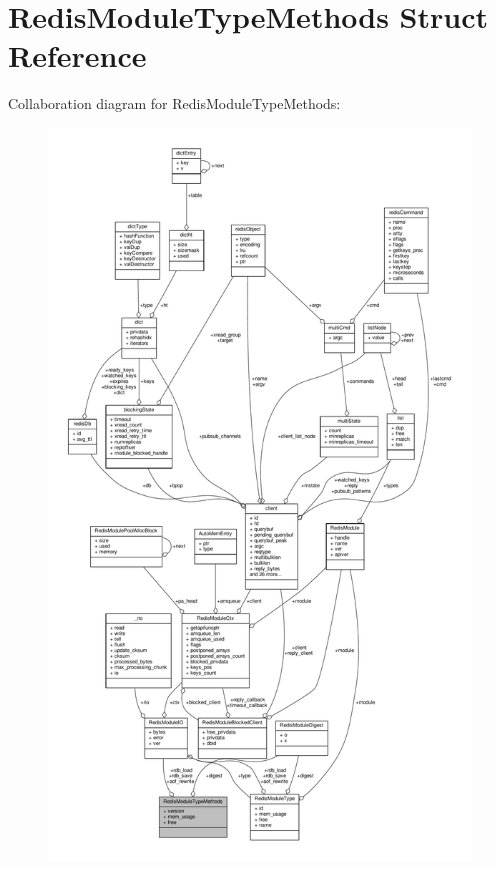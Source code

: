 \hypertarget{structRedisModuleTypeMethods}{}\section{Redis\+Module\+Type\+Methods Struct Reference}
\label{structRedisModuleTypeMethods}


Collaboration diagram for Redis\+Module\+Type\+Methods\+:\nopagebreak
\begin{figure}[H]
\begin{center}
\leavevmode
\includegraphics[height=550pt]{structRedisModuleTypeMethods__coll__graph}
\end{center}
\end{figure}
